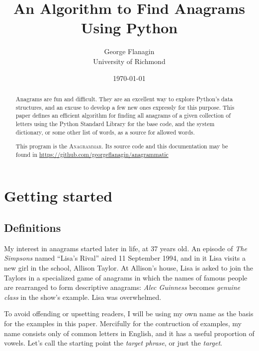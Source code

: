 \documentclass[letterpaper, 11pt]{article}
\title{An Algorithm to Find Anagrams Using Python}
\author{George Flanagin\\University of Richmond\\\lit{gflanagin@richmond.edu}}
\date{\today}
\providecommand{\anagrammar}{A\textsc{nagrammar}\xspace}
\begin{document}
\maketitle
\begin{abstract}
Anagrams are fun and difficult. They are an excellent way to explore
Python's data structures, and an excuse to develop a few new ones
expressly for this purpose. This paper defines an efficient algorithm
for finding all anagrams of a given collection of letters using the
Python Standard Library for the base code, and the system dictionary,
or some other list of words,
as a source for allowed words. 

This program is the \anagrammar. Its source code and this documentation
may be found in \href{https://github.com/georgeflanagin/anagrammatic}
{https://github.com/georgeflanagin/anagrammatic}

\end{abstract}

\tableofcontents
\listoffigures

\newpage
\pagewiselinenumbers
\section{Getting started}

\subsection{Definitions}
My interest in anagrams started later in life, at 37 years old. An episode of
\emph{The Simpsons} named ``Lisa's Rival'' aired 11 September 1994,
and in it Lisa visits a new girl in the school, Allison
Taylor. At Allison's house, Lisa is asked to join the Taylors in a
specialized game of anagrams in which the names of famous people
are rearranged to form descriptive anagrams: \emph{Alec Guinness}
becomes \emph{genuine class} in the show's example. Lisa was overwhelmed.

To avoid offending or upsetting readers, I will be using my own
name as the basis for the examples in this paper. Mercifully for
the contruction of examples, my name consists only of common letters
in English, and it has a useful proportion of vowels. Let's call
the starting point the \emph{target phrase}, or just the \emph{target}.
\end{document}
